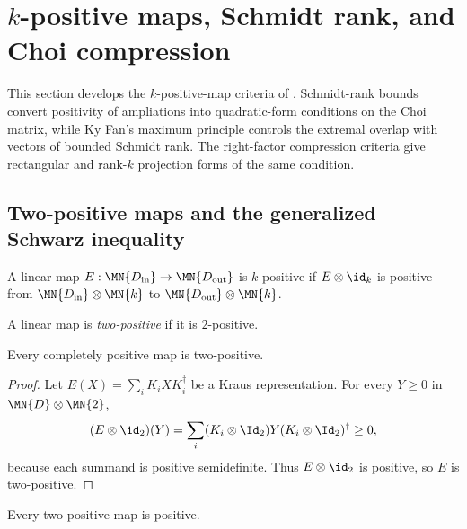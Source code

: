 \section{$k$-positive maps, Schmidt rank, and Choi compression}

This section develops the $k$-positive-map criteria of
\cite[Chapter~3]{Wolf2012Quantum}. Schmidt-rank bounds convert positivity of
ampliations into quadratic-form conditions on the Choi matrix, while Ky
Fan's maximum principle controls the extremal overlap with vectors of bounded
Schmidt rank. The right-factor compression criteria give rectangular and
rank-$k$ projection forms of the same condition.

\subsection{Two-positive maps and the generalized Schwarz inequality}

\begin{definition}\label{def:k_positive_map}
    \leanok
    A linear map $E : \MN{D_{\rm in}} \to \MN{D_{\rm out}}$ is $k$-positive
    if $E \otimes \id_{k}$ is positive from
    $\MN{D_{\rm in}} \otimes \MN{k}$ to
    $\MN{D_{\rm out}} \otimes \MN{k}$.
\end{definition}

\begin{definition}
    \label{def:2positive_map}
    \leanok
    A linear map is \emph{two-positive} if it is $2$-positive.
\end{definition}

\begin{theorem}
    \label{thm:cp_implies_two_positive}
    \leanok
    Every completely positive map is two-positive.
\end{theorem}

\begin{proof}
    \leanok
    Let $E(X)=\sum_i K_iXK_i^\dagger$ be a Kraus representation. For every
    $Y\geq0$ in $\MN{D}\otimes\MN{2}$,
    \[
        (E\otimes\id_2)(Y)
        =\sum_i (K_i\otimes\Id_2)Y(K_i\otimes\Id_2)^\dagger\geq0,
    \]
    because each summand is positive semidefinite. Thus
    $E\otimes\id_2$ is positive, so $E$ is two-positive.
\end{proof}

\begin{theorem}
    \label{thm:two_positive_implies_positive}
    \leanok
    Every two-positive map is positive.
\end{theorem}

